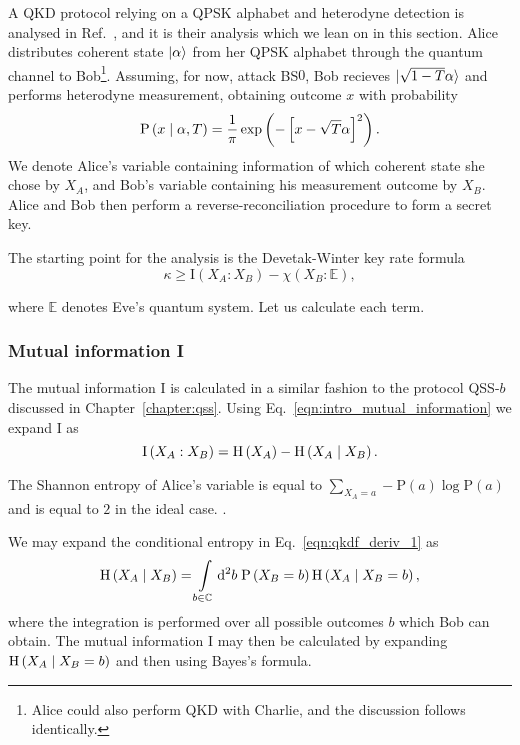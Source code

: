 A QKD protocol relying on a QPSK alphabet and heterodyne detection is analysed in Ref.~\cite{Papanastasiou2018}, and it is their analysis which we lean on in this section. Alice distributes coherent state $\ket{\alpha}$ from her QPSK alphabet through the quantum channel to Bob\footnote{Alice could also perform QKD with Charlie, and the discussion follows identically.}. Assuming, for now, attack BS$0$, Bob recieves $\ket{\sqrt{1-T}\alpha}$ and performs heterodyne measurement, obtaining outcome $x$ with probability
\begin{equation}
\text{P}\left(x\; \middle| \; \alpha, T\right) = \frac{1}{\pi}\exp\left( - \left[ x - \sqrt{T}\alpha\right]^2\right).
\end{equation}
We denote Alice's variable containing information of which coherent state she chose by $X_A$, and Bob's variable containing his measurement outcome by $X_B$. Alice and Bob then perform a reverse-reconciliation procedure \cite{Grosshans2002, Grosshans2003, Laudenbach2017} to form a secret key.

The starting point for the analysis is the Devetak-Winter key rate formula \cite{Devetak2004} 
\begin{equation}
\kappa \ge \text{I}\left(X_A : X_B\right) - \chi\left(X_B : \mathbb{E}\right),
\end{equation}

\noindent where $\mathbb{E}$ denotes Eve's quantum system. Let us calculate each term.

\subsubsection{Mutual information I}
The mutual information I is calculated in a similar fashion to the protocol QSS-$b$ discussed in Chapter~\ref{chapter:qss}. Using Eq.~\ref{eqn:intro_mutual_information} we expand $\text{I}$ as
\begin{equation}\label{eqn:qkdf_deriv_1}
\text{I}\left(X_A : X_B\right) = \text{H}\left(X_A\right) - \text{H}\left(X_A \; \middle| \; X_B\right).
\end{equation}

\noindent The Shannon entropy of Alice's variable is equal to $\sum_{X_A=a} - \text{P}\left(a\right) \log \text{P}\left(a\right)$ and is equal to $2$ in the ideal case. .

We may expand the conditional entropy in Eq.~\ref{eqn:qkdf_deriv_1} as
\begin{equation}\label{eqn:qkdf_deriv_2}
\text{H}\left(X_A \; \middle| \; X_B\right) = \int\limits_{b \in \mathbb{C}} \mathop{}\!\mathrm{d^2} b \; \text{P}\left(X_B=b\right) \text{H}\left(X_A \; \middle| \; X_B=b\right),
\end{equation}
where the integration is performed over all possible outcomes $b$ which Bob can obtain. The mutual information I may then be calculated by expanding $\text{H}\left(X_A \; \middle| \; X_B=b\right)$ and then using Bayes's formula. 

